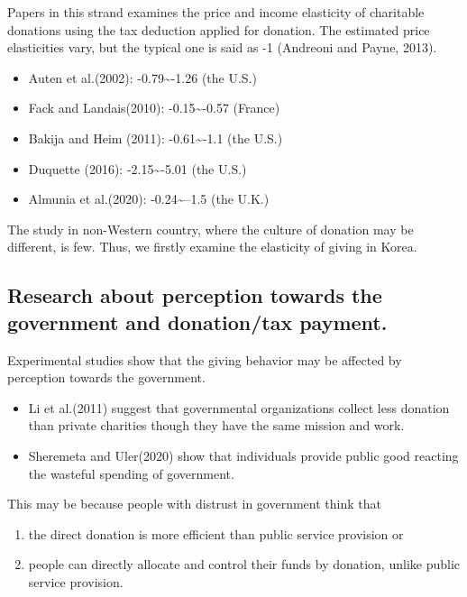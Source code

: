\documentclass[ review  , 3p ]{elsarticle}
\providecommand{\tightlist}{%
  \setlength{\itemsep}{0pt}\setlength{\parskip}{0pt}}
\begin{document}
  Papers in this strand examines the price and income elasticity of charitable donations using the tax deduction applied for donation.
  The estimated price elasticities vary, but the typical one is said as -1 (Andreoni and Payne, 2013).
  
  \begin{itemize}
  \tightlist
  \item
    Auten et al.(2002): -0.79\textasciitilde-1.26 (the U.S.)
  \item
    Fack and Landais(2010): -0.15\textasciitilde-0.57 (France)
  \item
    Bakija and Heim (2011): -0.61\textasciitilde-1.1 (the U.S.)
  \item
    Duquette (2016): -2.15\textasciitilde-5.01 (the U.S.)
  \item
    Almunia et al.(2020): -0.24\textasciitilde--1.5 (the U.K.)
  \end{itemize}
  
  The study in non-Western country, where the culture of donation may be different, is few.
  Thus, we firstly examine the elasticity of giving in Korea.
  
  \hypertarget{research-about-perception-towards-the-government-and-donationtax-payment.}{%
  \subsection{Research about perception towards the government and donation/tax payment.}\label{research-about-perception-towards-the-government-and-donationtax-payment.}}
  
  Experimental studies show that the giving behavior may be affected by perception towards the government.
  
  \begin{itemize}
  \tightlist
  \item
    Li et al.(2011) suggest that governmental organizations collect less donation than private charities though they have the same mission and work.
  \item
    Sheremeta and Uler(2020) show that individuals provide public good reacting the wasteful spending of government.
  \end{itemize}
  
  This may be because people with distrust in government think that
  
  \begin{enumerate}
  \def\labelenumi{\arabic{enumi}.}
  \tightlist
  \item
    the direct donation is more efficient than public service provision or
  \item
    people can directly allocate and control their funds by donation, unlike public service provision.
  \end{enumerate}
  
\end{document}

